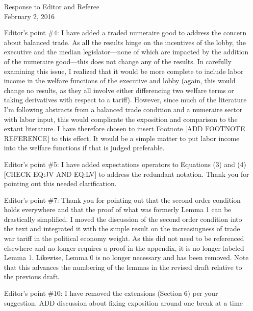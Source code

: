 \documentclass[12pt]{article}
\begin{document}
\begin{center}
\large Response to Editor and Referee \\
\normalsize February 2, 2016
\end{center}

Editor's point $\#$4: I have added a traded numeraire good to address the concern about balanced trade. As all the results hinge on the incentives of the lobby, the executive and the median legislator---none of which are impacted by the addition of the numeraire good---this does not change any of the results. In carefully examining this issue, I realized that it would be more complete to include labor income in the welfare functions of the executive and lobby (again, this would change no results, as they all involve either differencing two welfare terms or taking derivatives with respect to a tariff). However, since much of the literature I'm following abstracts from a balanced trade condition and a numeraire sector with labor input, this would complicate the exposition and comparison to the extant literature. I have therefore chosen to insert Footnote [{\color{blue}ADD FOOTNOTE REFERENCE}] to this effect. It would be a simple matter to put labor income into the welfare functions if that is judged preferable.

Editor's point $\#$5: I have added expectations operators to Equations (3) and (4) [{\color{blue}CHECK EQ:JV AND EQ:LV}] to address the redundant notation. Thank you for pointing out this needed clarification.

Editor's point $\#$7: Thank you for pointing out that the second order condition holds everywhere and that the proof of what was formerly Lemma 1 can be drastically simplified. I moved the discussion of the second order condition into the text and integrated it with the simple result on the increasingness of trade war tariff in the political economy weight. As this did not need to be referenced elsewhere and no longer requires a proof in the appendix, it is no longer labeled Lemma 1. Likewise, Lemma 0 is no longer necessary and has been removed. Note that this advances the numbering of the lemmas in the revised draft relative to the previous draft. 

Editor's point $\#10$: I have removed the extensions (Section 6) per your suggestion. {\color{blue}ADD discussion about fixing exposition around one break at a time}
\end{document}
